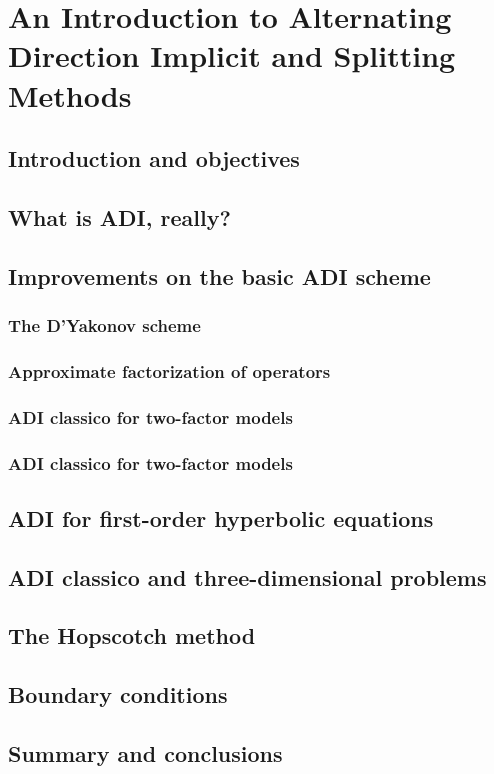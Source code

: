 \chapter{An Introduction to Alternating Direction Implicit and Splitting Methods}

\section{Introduction and objectives}

\section{What is ADI, really?}

\section{Improvements on the basic ADI scheme}

\subsection{The D’Yakonov scheme}

\subsection{Approximate factorization of operators}

\subsection{ADI classico for two-factor models}

\subsection{ADI classico for two-factor models}

\section{ADI for first-order hyperbolic equations}

\section{ADI classico and three-dimensional problems}

\section{The Hopscotch method}

\section{Boundary conditions}

\section{Summary and conclusions}